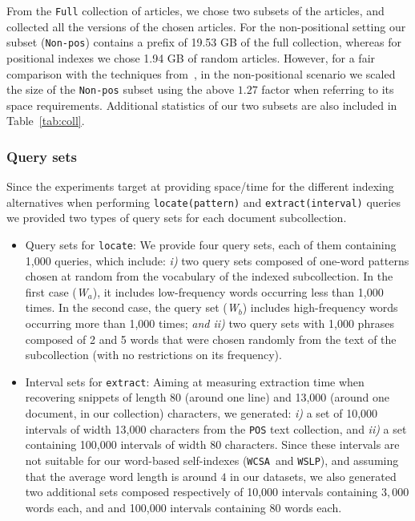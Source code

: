 \documentclass[review]{elsarticle}
\newcommand{\wcsa}{\texttt{WCSA}}
\newcommand{\wslp}{\texttt{WSLP}}
\begin{document}
From the {\tt Full} collection of articles, we chose two subsets of the articles, and collected all the versions of the chosen articles. 
For the non-positional setting our subset (\texttt{Non-pos}) contains a prefix of 19.53 GB of the full collection, whereas for positional indexes we
chose 1.94 GB of random articles. However, for a fair comparison with the techniques from~\cite{HZS10}, in the non-positional scenario we scaled the size
of the \texttt{Non-pos} subset using the above $1.27$ factor when referring to its space requirements. Additional statistics of our two subsets are
also included in Table~\ref{tab:coll}.

%


\subsubsection{Query sets}

Since the experiments target at providing space/time for the different indexing alternatives 
when performing \texttt{locate(pattern)} and \texttt{extract(interval)} queries we provided two types
of query sets for each document subcollection.

\begin{itemize} 
	\item Query sets for \texttt{locate}: We provide four query sets, each of them containing 1,000 queries, which include:
	{\em i)} two query sets composed of one-word patterns chosen at random from the vocabulary of the indexed subcollection. In the first
	case ({\em W$_a$}), it includes low-frequency words occurring less than 1,000 times. In the second case, the query set ({\em W$_b$}) includes
	high-frequency words occurring more than 1,000 times; {\em and ii)} two query sets with 1,000 phrases composed of 2 and 5 words that
	were chosen randomly from the text of the subcollection (with no restrictions on its frequency).
	
	\item Interval sets for \texttt{extract}: Aiming at measuring extraction time when recovering snippets of length 80 (around one line) and 13,000 (around one document, in our
	collection) characters, we generated: {\em i)} a set of 10,000 intervals of width 13,000 characters from the {\tt POS} text collection, and {\em ii)}  a set containing
	100,000 intervals of width 80 characters. Since these intervals are not suitable for our word-based self-indexes (\wcsa\ and \wslp), and assuming that the average word length 
	is around $4$ in our datasets, we also generated two additional sets composed respectively of 10,000 intervals containing $3,000$ words each, and	
	and 100,000 intervals containing $80$ words each.
\end{itemize}
\end{document}
